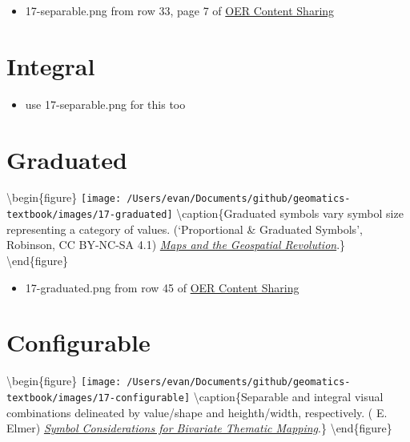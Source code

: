 \documentclass[
]{book}
\providecommand{\tightlist}{%
  \setlength{\itemsep}{0pt}\setlength{\parskip}{0pt}}
\begin{document}
\begin{itemize}
\tightlist
\item
  17-separable.png from row 33, page 7 of \href{https://docs.google.com/spreadsheets/d/1LqzXn00wMeIjHWstNT3tMImNDZirLGc3g72jFOQc_8I/edit\#gid=817407192}{OER Content Sharing}
\end{itemize}

\hypertarget{integral}{%
\section{Integral}\label{integral}}

\begin{itemize}
\tightlist
\item
  use 17-separable.png for this too
\end{itemize}

\hypertarget{graduated}{%
\section{Graduated}\label{graduated}}

\textbackslash begin\{figure\}
\texttt{[image: /Users/evan/Documents/github/geomatics-textbook/images/17-graduated]} \textbackslash caption\{Graduated symbols vary symbol size representing a category of values. (`Proportional \& Graduated Symbols', \citet{Anthony} Robinson, CC BY-NC-SA 4.1) \href{https://www.e-education.psu.edu/maps/l5_p3.html}{\emph{Maps and the Geospatial Revolution}}.\}\label{fig:17-graduated}
\textbackslash end\{figure\}

\begin{itemize}
\tightlist
\item
  17-graduated.png from row 45 of \href{https://docs.google.com/spreadsheets/d/1LqzXn00wMeIjHWstNT3tMImNDZirLGc3g72jFOQc_8I/edit\#gid=817407192}{OER Content Sharing}
\end{itemize}

\hypertarget{configurable}{%
\section{Configurable}\label{configurable}}

\textbackslash begin\{figure\}
\texttt{[image: /Users/evan/Documents/github/geomatics-textbook/images/17-configurable]} \textbackslash caption\{Separable and integral visual combinations delineated by value/shape and heighth/width, respectively. (\citet{Martin} E. Elmer) \href{https://minds.wisconsin.edu/bitstream/handle/1793/67887/Elmer\%20Martin\%20E\%202012.pdf?sequence=1\&isAllowed=y}{\emph{Symbol Considerations for Bivariate Thematic Mapping}}.\}\label{fig:17-configurable}
\textbackslash end\{figure\}
\end{document}

